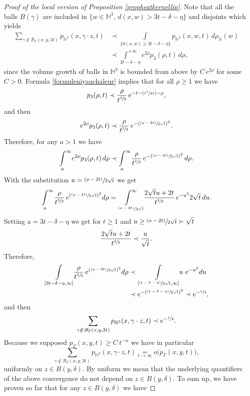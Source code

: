 \documentclass[JEP,XML,SOM,Unicode,NoFloatCountersInSection,published]{cedram}
\let\mathcal\mathscr
\newcommand{\Psfrac}[2]{(\sfrac{#1}{#2})}
\newcommand{\psfrac}[2]{\sfrac{(#1)}{#2}}
\theoremstyle{plain}
\theoremstyle{definition}
\newcommand{\HH}{\mathbb{H}}
\newcommand{\inte}[1]{\underset{#1}{\int}}
\newcommand{\somme}[1]{\sum_{#1}}
\begin{document}
\begin{proof}[Proof of the local version of Proposition \ref{propheatkernellip}]
Note that all the balls $B(\gamma)$ are included in $ \{ w \in \HH^3, \,d(x,w) > 3t - \delta - \eta \}$ and disjoints which yields
\begin{align*}
\somme{\gamma \notin \mathcal{B}_{\Gamma}(x,y,3t)} p_{\HH^3}(x, \gamma \cdot z,t)
& \prec \inte{ \{ d(x,w) \ge 3t - \delta - \eta \} } p_{\HH^3}(x,w,t) \,d\mu_h(w)\\
& \prec \underset{{3t - \delta - \eta}}{\int^{+ \infty}} e^{2\rho} p_{3}(\rho,t) \,d \rho,
\end{align*}
since the volume growth of balls in $\HH^3$ is bounded from above by $C \, e^{2\rho}$ for some $C > 0$. Formula \eqref{formuleniyauchaleur} implies that for all $\rho \ge 1$ we have
\begin{equation*}
p_{3}(\rho,t) \prec \frac{\rho}{t^{\sfrac{3}{2}}}\, e^{- t - \Psfrac{\rho^2}{4t} - \rho},
\end{equation*}
and then
\[
e^{2 \rho} p_{3}(\rho,t) \prec \frac{\rho}{t^{\sfrac{3}{2}}}\, e^{ - (\psfrac{\rho - 2t}{2 \sqrt{t}})^2}.
\]
Therefore, for any $a > 1$ we have
\[
\inte{a}^{\infty} e^{2 \rho} p_{3}(\rho,t) \,d \rho \prec \inte{a}^{\infty} \frac{\rho}{t^{\sfrac{3}{2}}} \, e^{ -(\psfrac{\rho - 2t}{2 \sqrt{t}})^2}\,d \rho.
\]
With the substitution $ u = \psfrac{\rho - 2t}{2 \sqrt{t}} $ we get
\[
\inte{a}^{\infty} \frac{\rho}{t^{\sfrac{3}{2}}} \, e^{(\psfrac{\rho - 2t}{2 \sqrt{t}})^2} d \rho = \underset{\psfrac{a - 2t}{2 \sqrt{t}}}{\int^{\infty}} \frac{ 2 \sqrt{t} u + 2t }{t^{\sfrac{3}{2}}} \, e^{ - u^2 } 2 \sqrt{t} \,d u.
\]
Setting $a = 3t - \delta - \eta$ we get for $t \ge 1$ and $u \ge \psfrac{a - 2t}{2 \sqrt{t}} \succ \sqrt{t} $
\[
\frac{ 2 \sqrt{t} u + 2t }{t^{\sfrac{3}{2}}} \prec \frac{u}{\sqrt{t}}.
\]
Therefore,
\begin{align*}
\inte{[3t - \delta - \eta, \infty]} \frac{\rho}{t^{\sfrac{3}{2}}} \, e^{(\psfrac{\rho - 2t}{2 \sqrt{t}})^2} d \rho & \prec \inte{[\psfrac{t - \delta - \eta}{2 \sqrt{t}}, \infty]} u \ e^{ - u^2 } d u\\
& \prec e^{ -(\psfrac{t - \delta - \eta}{2 \sqrt{t}})^2 } \prec e^{ - \sfrac{t }{4} },
\end{align*}
and then
\[
\somme{\gamma \notin \mathcal{B}_{\Gamma}(x,y,3t)} p_{\HH^3}(x, \gamma \cdot z,t) \prec e^{ - \sfrac{t}{4} }.
\]
Because we supposed $p_{\Gamma}(x,y,t) \ge C \ t^{-\alpha}$ we have in particular
\[
\somme{ \gamma \notin \mathcal{B}_{\Gamma}(x,y,3t) } p_{\HH^3}(x, \gamma \cdot z,t) \underset{t \to \infty}{=} o \bigl(p_{\Gamma}(x,y,t) \bigr),
\]
uniformly on $z \in B(y,\delta)$. By uniform we mean that the underlying quantifiers of the above convergence do not depend on $z \in B(y, \delta)$. To sum up, we have proven so far that for any $z \in B(y, \delta)$ we have

\end{proof}
\end{document}
